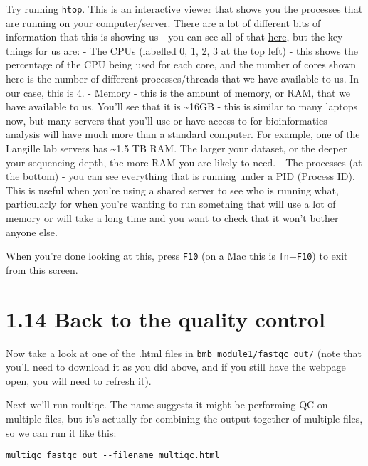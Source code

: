 \documentclass[
]{book}
\begin{document}
Try running \texttt{htop}. This is an interactive viewer that shows you the processes that are running on your computer/server. There are a lot of different bits of information that this is showing us - you can see all of that \href{https://monovm.com/blog/what-is-htop-and-what-does-it-do/\#:~:text=Htop\%20is\%20an\%20interactive\%20system,system\%20processes\%20can\%20be\%20viewed.}{here}, but the key things for us are:
- The CPUs (labelled 0, 1, 2, 3 at the top left) - this shows the percentage of the CPU being used for each core, and the number of cores shown here is the number of different processes/threads that we have available to us. In our case, this is 4.
- Memory - this is the amount of memory, or RAM, that we have available to us. You'll see that it is \textasciitilde16GB - this is similar to many laptops now, but many servers that you'll use or have access to for bioinformatics analysis will have much more than a standard computer. For example, one of the Langille lab servers has \textasciitilde1.5 TB RAM. The larger your dataset, or the deeper your sequencing depth, the more RAM you are likely to need.
- The processes (at the bottom) - you can see everything that is running under a PID (Process ID). This is useful when you're using a shared server to see who is running what, particularly for when you're wanting to run something that will use a lot of memory or will take a long time and you want to check that it won't bother anyone else.

When you're done looking at this, press \texttt{F10} (on a Mac this is \texttt{fn}+\texttt{F10}) to exit from this screen.

\section{1.14 Back to the quality control}\label{back-to-the-quality-control}

Now take a look at one of the .html files in \texttt{bmb\_module1/fastqc\_out/} (note that you'll need to download it as you did above, and if you still have the webpage open, you will need to refresh it).

Next we'll run multiqc. The name suggests it might be performing QC on multiple files, but it's actually for combining the output together of multiple files, so we can run it like this:

\begin{verbatim}
multiqc fastqc_out --filename multiqc.html
\end{verbatim}
\end{document}
